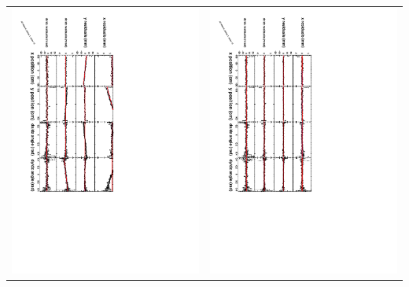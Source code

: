 \documentclass[compress]{beamer}
\begin{document}
\begin{frame}
{\begin{minipage}{1.1\linewidth}
\begin{tabular}{p{0.5\linewidth} p{0.5\linewidth}}
\includegraphics[height=\linewidth, angle=90]{exampleMC_wh0st1sec10_polybefore.pdf} & \includegraphics[height=\linewidth, angle=90]{exampleMC_wh0st1sec10_polyafter.pdf} \\
\end{tabular}\end{minipage}}
\end{frame}
\end{document}
